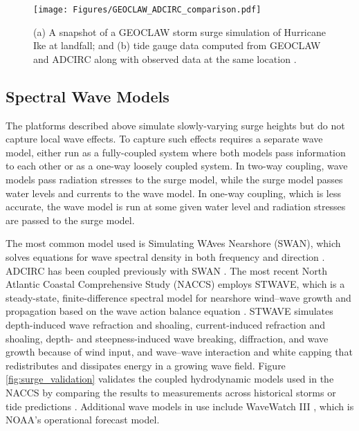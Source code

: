 \begin{figure}[htb]
    \centering
    \texttt{[image: Figures/GEOCLAW\_ADCIRC\_comparison.pdf]}
    \caption{(a) A snapshot of a GEOCLAW storm surge simulation of Hurricane Ike at landfall; and (b) tide gauge data computed from GEOCLAW and ADCIRC along with observed data at the same location \citep{mandli2016clawpack}.}
    \label{fig:GEOCLAW_ADCIRC_comparison}
\end{figure}

\subsection{Spectral Wave Models}

The platforms described above simulate slowly-varying surge heights but do not capture local wave effects. To capture such effects requires a separate wave model, either run as a fully-coupled system where both models pass information to each other or as a one-way loosely coupled system. In two-way coupling, wave models pass radiation stresses to the surge model, while the surge model passes water levels and currents to the wave model. In one-way coupling, which is less accurate, the wave model is run at some given water level and radiation stresses are passed to the surge model.

The most common model used is Simulating WAves Nearshore (SWAN), which solves equations for wave spectral density in both frequency and direction \citep{zijlema2010computation}. ADCIRC has been coupled previously with SWAN \citep{dietrich2011modeling, kennedy2012tropical}. The most recent North Atlantic Coastal Comprehensive Study (NACCS) \citep{usace2015north} employs STWAVE, which is a steady-state, finite-difference spectral model for nearshore wind--wave growth and propagation based on the wave action balance equation \citep{smith2001stwave}. STWAVE simulates depth-induced wave refraction and shoaling, current-induced refraction and shoaling, depth- and steepness-induced wave breaking, diffraction, and wave growth because of wind input, and wave--wave interaction and white capping that redistributes and dissipates energy in a growing wave field. Figure \ref{fig:surge_validation} validates the coupled hydrodynamic models used in the NACCS by comparing the results to measurements across historical storms or tide predictions \citep{nadal-caraballo2015north}. Additional wave models in use include WaveWatch III \citep{smith2018validation}, which is NOAA's operational forecast model. 

